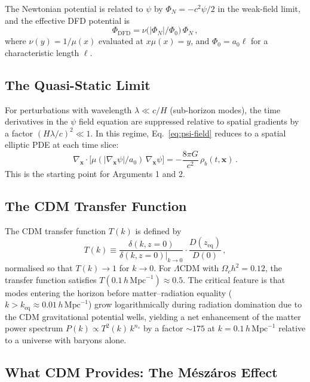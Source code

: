 \documentclass[12pt,a4paper]{article}
\newcommand{\hMpc}{\,h\,\mathrm{Mpc}^{-1}}
\begin{document}
The Newtonian potential is related to $\psi$ by $\Phi_N = -c^2\psi/2$
in the weak-field limit, and the effective DFD potential is
\begin{equation}
\label{eq:Phi-DFD}
\Phi_{\mathrm{DFD}} = \nu\bigl(|\Phi_N|/\Phi_0\bigr)\,\Phi_N\,,
\end{equation}
where $\nu(y) = 1/\mu(x)$ evaluated at $x\mu(x) = y$, and
$\Phi_0 = a_0 \ell$ for a characteristic length $\ell$.

\subsection{The Quasi-Static Limit}

For perturbations with wavelength $\lambda \ll c/H$ (sub-horizon modes),
the time derivatives in the $\psi$ field equation are suppressed relative
to spatial gradients by a factor $(H\lambda/c)^2 \ll 1$. In this regime,
Eq.~\eqref{eq:psi-field} reduces to a spatial elliptic PDE at each
time slice:
\begin{equation}
\label{eq:elliptic}
\nabla_{\mathbf{x}} \cdot \bigl[\mu(|\nabla_{\mathbf{x}}\psi|/a_0)\,
\nabla_{\mathbf{x}}\psi\bigr] = -\frac{8\pi G}{c^2}\,\rho_b(t,\mathbf{x})\,.
\end{equation}
This is the starting point for Arguments 1 and 2.

\subsection{The CDM Transfer Function}

The CDM transfer function $T(k)$ is defined by
\begin{equation}
\label{eq:transfer}
T(k) \equiv \frac{\delta(k, z=0)}{\delta(k, z=0)|_{k\to 0}}
\cdot \frac{D(z_{\mathrm{eq}})}{D(0)}\,,
\end{equation}
normalised so that $T(k) \to 1$ for $k \to 0$. For
$\Lambda$CDM with $\Omega_c h^2 = 0.12$, the transfer function
satisfies $T(0.1\hMpc) \approx 0.5$. The critical feature is that
modes entering the horizon before matter--radiation equality
($k > k_{\mathrm{eq}} \approx 0.01\hMpc$) grow logarithmically
during radiation domination due to the CDM gravitational potential
wells, yielding a net enhancement of the matter power spectrum
$P(k) \propto T^2(k)\,k^{n_s}$ by a factor $\sim 175$ at
$k = 0.1\hMpc$ relative to a universe with baryons alone.

\subsection{What CDM Provides: The M\'esz\'aros Effect}
\end{document}
